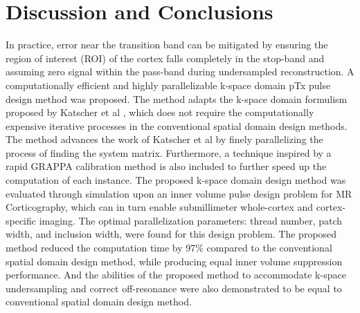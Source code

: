 \section*{Discussion and Conclusions}
In practice, error near the transition band can be mitigated by ensuring the region of interest (ROI) of the cortex falls completely in the stop-band and assuming zero signal within the pass-band during undersampled reconstruction. 
A computationally efficient and highly parallelizable k-space domain pTx pulse design method was proposed.
The method adapts the k-space domain formulism proposed by Katscher et al \cite{katscher2003transmit}, which does not require the computationally expensive iterative processes in the conventional spatial domain design methods. The method advances the work of Katscher et al \cite{katscher2003transmit} by finely parallelizing the process of finding the system matrix. Furthermore, a technique inspired by a rapid GRAPPA calibration method \cite{luo2019grappa} is also included to further speed up the computation of each instance. The proposed k-space domain design method was evaluated through simulation upon an inner volume pulse design problem for MR Corticography, which can in turn enable submillimeter whole-cortex and cortex-specific imaging. The optimal parallelization parameters: thread number, patch width, and inclusion width, were found for this design problem. The proposed method reduced the computation time by 97\% compared to the conventional spatial domain design method, while producing equal inner volume suppression performance. And the abilities of the proposed method to accommodate k-space undersampling and correct off-resonance were also demonstrated to be equal to conventional spatial domain design method.